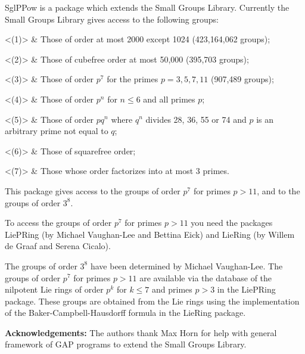 

SglPPow is a package which extends the Small Groups Library. Currently the 
Small Groups Library gives access to the following groups:

\beginitems
<(1)> & Those of order at most 2000 except 1024 (423,164,062 groups);

<(2)> & Those of cubefree order at most 50,000 (395,703 groups);

<(3)> & Those of order $p^{7}$ for the primes $p=3,5,7,11$ (907,489 groups);

<(4)> & Those of order $p^{n}$ for $n\leq 6$ and all primes $p$;

<(5)> & Those of order $pq^{n}$ where $q^{n}$ divides 28, 36, 55 or 74 and 
     $p$ is an arbitrary prime not equal to $q$;

<(6)> & Those of squarefree order;

<(7)> & Those whose order factorizes into at most 3 primes.
\enditems

This package gives access to the groups of order $p^{7}$ for primes 
$p>11$, and to the groups of order $3^{8}$.

To access the groups of order $p^{7}$ for primes $p>11$ you need the 
packages LiePRing (by Michael Vaughan-Lee and Bettina Eick) and LieRing
(by Willem de Graaf and Serena Cicalo).

The groups of order $3^{8}$ have been determined by Michael Vaughan-Lee.
The groups of order $p^{7}$ for primes $p>11$ are available via the 
database of the nilpotent Lie rings of order $p^{k}$ for $k\leq 7$ and
primes $p>3$ in the LiePRing package. These groups are obtained from the 
Lie rings using the implementation of the Baker-Campbell-Hausdorff formula 
in the LieRing package.

{\bf Acknowledgements:} The authors thank Max Horn for help with general 
framework of GAP programs to extend the Small Groups Library.

